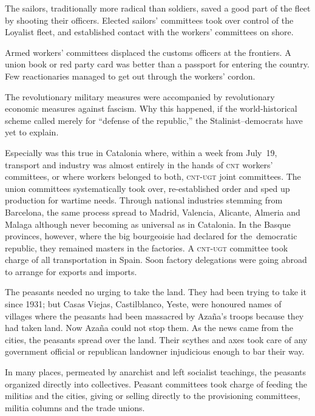 The sailors, traditionally more radical than soldiers, saved a good part of the fleet by shooting their officers. Elected sailors’ committees took over control of the Loyalist fleet, and established contact with the workers’ committees on shore.

Armed workers’ committees displaced the customs officers at the frontiers. A union book or red party card was better than a passport for entering the country. Few reactionaries managed to get out through the workers’ cordon.

The revolutionary military measures were accompanied by revolutionary economic measures against fascism. Why this happened, if the world-historical scheme called merely for ``defense of the republic,'' the Stalinist--democrats have yet to explain.

Especially was this true in Catalonia where, within a week from July~19, transport and industry was almost entirely in the hands of \textsc{cnt} workers’ committees, or where workers belonged to both, \textsc{cnt-ugt} joint committees. The union committees systematically took over, re-established order and sped up production for wartime needs. Through national industries stemming from Barcelona, the same process spread to Madrid, Valencia, Alicante, Almeria and Malaga although never becoming as universal as in Catalonia. In the Basque provinces, however, where the big bourgeoisie had declared for the~democratic republic, they remained masters in the factories. A \textsc{cnt-ugt} committee took charge of all transportation in Spain. Soon factory delegations were going abroad to arrange for exports and imports.

The peasants needed no urging to take the land. They had been trying to take it since 1931; but Casas Viejas, Castilblanco, Yeste, were honoured names of villages where the peasants had been massacred by Azaña’s troops because they had taken land. Now Azaña could not stop them. As the news came from the cities, the peasants spread over the land. Their scythes and axes took care of any government official or republican landowner injudicious enough to bar their way.

In many places, permeated by anarchist and left socialist teachings, the peasants organized directly into collectives. Peasant committees took charge of feeding the militias and the cities, giving or selling directly to the provisioning committees, militia columns and the trade unions.

